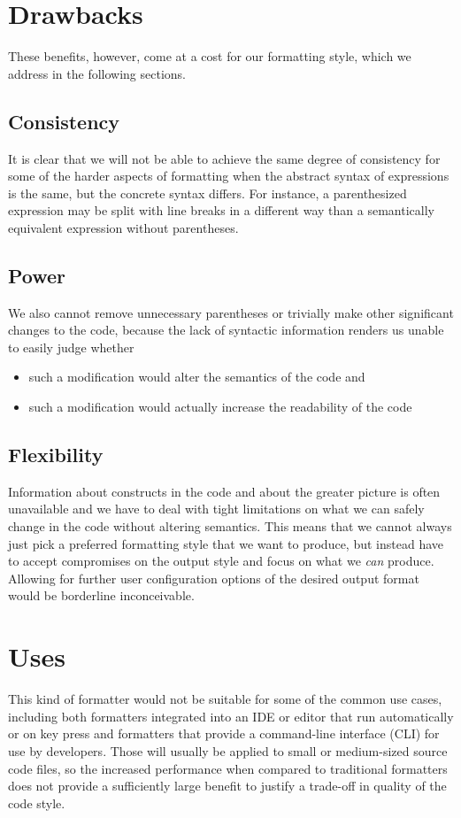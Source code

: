 \section{Drawbacks}
These benefits, however, come at a cost for our formatting style,
which we address in the following sections.

\subsection{Consistency}
It is clear that we will not be able to achieve the same degree of consistency
for some of the harder aspects of formatting
when the abstract syntax of expressions is the same,
but the concrete syntax differs.
For instance, a parenthesized expression may be split with line breaks
in a different way than a semantically equivalent expression without parentheses.

\subsection{Power}
We also cannot remove unnecessary parentheses or trivially make other significant changes to the code,
because the lack of syntactic information renders us unable to easily judge whether
\begin{itemize}
  \item such a modification would alter the semantics of the code and
  \item such a modification would actually increase the readability of the code
\end{itemize}

\subsection{Flexibility}
Information about constructs in the code and about the greater picture is often unavailable and
we have to deal with tight limitations on what we can safely change in the code without altering semantics.
This means that we cannot always just pick a preferred formatting style that we want to produce,
but instead have to accept compromises on the output style and focus on what we \textit{can} produce.
Allowing for further user configuration options of the desired output format would be borderline inconceivable.

\section{Uses}
This kind of formatter would not be suitable for some of the common use cases, including both
formatters integrated into an IDE or editor that run automatically or on key press and
formatters that provide a command-line interface (CLI) for use by developers.
Those will usually be applied to small or medium-sized source code files,
so the increased performance when compared to traditional formatters does not provide
a sufficiently large benefit to justify a trade-off in quality of the code style.

